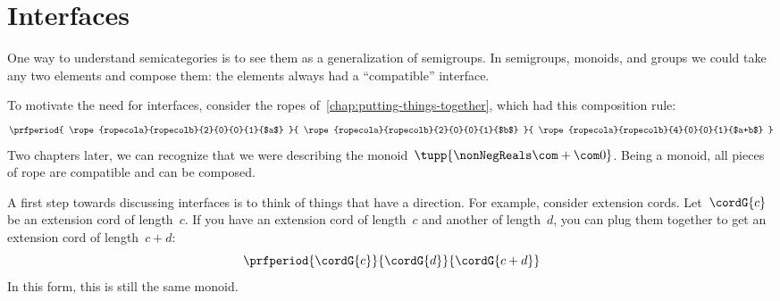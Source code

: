 
\section{Interfaces}\label{sec:interfaces}

One way to understand semicategories is to see them as a generalization of semigroups.
In semigroups, monoids, and groups we could take any two elements and compose them: the elements always had a ``compatible'' interface.

To motivate the need for interfaces, consider the ropes of~\cref{chap:putting-things-together}, which had this composition rule:
%
\begin{equation*}
    \prfperiod{
        \rope{ropecola}{ropecolb}{2}{0}{0}{1}{$a$}
    }{
        \rope{ropecola}{ropecolb}{2}{0}{0}{1}{$b$}
    }{
        \rope{ropecola}{ropecolb}{4}{0}{0}{1}{$a+b$}
    }
\end{equation*}
%
Two chapters later, we can recognize that we were describing the monoid~$\tupp{\nonNegReals \com + \com 0}$.
Being a monoid, all pieces of rope are compatible and can be composed.

A first step towards discussing interfaces is to think of things that have a direction.
For example, consider extension cords.
Let~$\cordG{c}$ be an extension cord of length~$c$.
If you have an extension cord of length~$c$ and another of length~$d$, you can plug them together to get an extension cord of length~$c+d$:
%
\begin{equation}
    \label{eq:cords}
    \prfperiod{
        \cordG{c}
    }{
        \cordG{d}
    }{
        \cordG{c+d}
    }
\end{equation}
%
In this form, this is still the same monoid.

